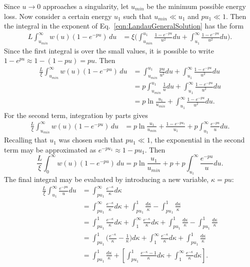 Since $u\rightarrow 0$ approaches a singularity, let $u_{min}$ be the minimum possible energy loss. Now consider a certain energy $u_1$ such that $u_{min}\ll u_1$ and $pu_1 \ll 1$. Then the integral in the exponent of Eq.~\eqref{eqn:LandauGeneralSolution} has the form
\begin{align*}
L\int_{u_{min}}^\infty w(u)  (1-e^{-pu})\, du &= \xi\Big( \int_{u_{min}} ^{u_1} \frac{1-e^{-pu}}{u^2} du + \int_{u_1} ^\infty \frac{1-e^{-pu}}{u^2} du\Big) .
\end{align*}
Since the first integral is over the small values, it is possible to write $1-e^{pu} \approx 1-(1-pu) = pu$. Then
\begin{align*}
\frac{L}{\xi}\int_{u_{min}} ^\infty w(u)  (1-e^{-pu})\, du &=\int_{u_{min}} ^{u_1} \frac{pu}{u^2} du + \int_{u_1} ^\infty \frac{1-e^{-pu}}{u^2} du\\
&=p\int_{u_{min}} ^{u_1} \frac{1}{u} du + \int_{u_1} ^\infty \frac{1-e^{-pu}}{u^2} du\\
&=p \ln\frac{u_1}{u_{min}} + \int_{u_1} ^\infty \frac{1-e^{-pu}}{u^2} du.
\end{align*}
For the second term, integration by parts gives
\begin{align*}
\frac{L}{\xi}\int_{u_{min}} ^\infty w(u)  (1-e^{-pu})\, du &=p \ln\frac{u_1}{u_{min}} + \frac{1-e^{-pu_1}}{u_1}+p\int_{u_1}^\infty \frac{e^{-pu}}{u} du.
\end{align*}
Recalling that $u_1$ was chosen such that $pu_1 \ll 1$, the exponential in the second term may be approximated as $e^{-pu_1}\approx 1-pu_1$. Then
\begin{equation} \label{eqn:landauIntermediate1}
\frac{L}{\xi}\int_0 ^\infty w(u)  (1-e^{-pu})\, du =p \ln\frac{u_1}{u_{min}} + p+p\int_{u_1}^\infty \frac{e^{-pu}}{u} du.
\end{equation}
The final integral may be evaluated by introducing a new variable, $\kappa=pu$:
\begin{align*}
\frac{L}{\xi}\int_{u_1}^\infty \frac{e^{-pu}}{u} du &= \int _{pu_1} ^\infty \frac{e^{-\kappa}}{\kappa}d\kappa\\
&= \int_{pu_1} ^\infty \frac{e^{-\kappa}}{\kappa} d\kappa + \int_{pu_1} ^1 \frac{d\kappa}{\kappa} - \int_{pu_1} ^1 \frac{d\kappa}{\kappa} \\
&= \int_{pu_1} ^1 \frac{e^{-\kappa}}{\kappa} d\kappa + \int_1 ^\infty \frac{e^{-\kappa}}{\kappa} d\kappa + \int_{pu_1} ^1 \frac{d\kappa}{\kappa} - \int_{pu_1} ^1 \frac{d\kappa}{\kappa} \\
&= \int_{pu_1} ^1 \Big(\frac{e^{-\kappa}}{\kappa}-\frac{1}{\kappa}\Big) d\kappa + \int_1 ^\infty \frac{e^{-\kappa}}{\kappa} d\kappa + \int_{pu_1} ^1 \frac{d\kappa}{\kappa} \\
&= \int_{pu_1} ^1 \frac{d\kappa}{\kappa} + \left[\int_{pu_1} ^1 \frac{e^{-\kappa}-1}{\kappa} d\kappa + \int_1 ^\infty \frac{e^{-\kappa}}{\kappa} d\kappa \right].
\end{align*}
